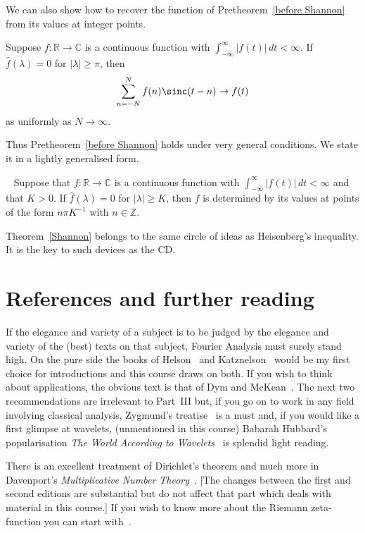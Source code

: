 We can also show how to recover the function of
Pretheorem~\ref{before Shannon} from its values
at integer points.
\begin{theorem}\label{Shannon constructive}
Suppose $f:{\mathbb R}\rightarrow{\mathbb C}$
is a continuous function with
$\int_{-\infty}^{\infty}|f(t)|\,dt<\infty$.
If $\hat{f}(\lambda)=0$
for $|\lambda|\geq\pi$,
then
\[\sum_{n=-N}^{N}f(n)\sinc(t-n)\rightarrow f(t)\]
as uniformly as $N\rightarrow\infty$.
\end{theorem}
Thus Pretheorem~\ref{before Shannon} holds under
very general conditions. We state it in a lightly
generalised form.
\begin{theorem}~\label{Shannon}
Suppose that $f:{\mathbb R}\rightarrow{\mathbb C}$
is a continuous function with
$\int_{-\infty}^{\infty}|f(t)|\,dt<\infty$
and that $K>0$.
If $\hat{f}(\lambda)=0$
for $|\lambda|\geq K$,
then $f$ is determined by its values at points of the form
$n\pi K^{-1}$ with $n\in{\mathbb Z}$.
\end{theorem}

Theorem~\ref{Shannon} belongs to the same circle of ideas
as Heisenberg's inequality. It is the key to such devices
as the CD.

\section{References and further reading}
If the elegance and variety of a subject is to be judged
by the elegance and variety of the (best) texts
on that subject, Fourier Analysis must surely
stand high. On the pure side the books
of Helson~\cite{Helson} and Katznelson~\cite{Katznelson}
would be my first choice for introductions
and this course draws on both. If you wish
to think about applications, the obvious text
is that of Dym and McKean~\cite{Dym}.
The next two recommendations are irrelevant
to Part~III but, if you go on to work in
any field involving classical analysis,
Zygmund's treatise~\cite{Zygmund} is a must
and, if you would like a first glimpse
at wavelets, (unmentioned in this course)
Babarah Hubbard's popularisation
\emph{The World According to Wavelets}~\cite{Hubbard}
is splendid light reading.


There is an excellent treatment of Dirichlet's
theorem and much more in Davenport's
\emph{Multiplicative Number Theory}~\cite{Davenport}.
[The changes between the first and second editions
are substantial but do not affect that part which
deals with material in this course.]
If you wish to know more about the Riemann zeta-function
you can start with~\cite{Patterson}.

